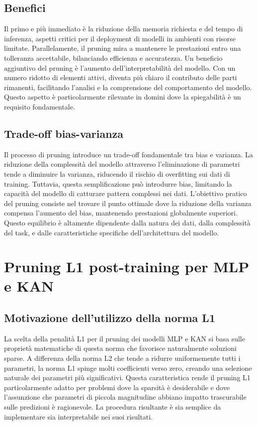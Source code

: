 \documentclass[a4paper,12pt]{report}
\begin{document}
	\subsection{Benefici}
	Il primo e più immediato è la riduzione della memoria richiesta e del tempo di inferenza, aspetti critici per il deployment di modelli in ambienti con risorse limitate. Parallelamente, il pruning mira a mantenere le prestazioni entro una tolleranza accettabile, bilanciando efficienza e accuratezza. Un beneficio aggiuntivo del pruning è l'aumento dell'interpretabilità del modello. Con un numero ridotto di elementi attivi, diventa più chiaro il contributo delle parti rimanenti, facilitando l'analisi e la comprensione del comportamento del modello. Questo aspetto è particolarmente rilevante in domini dove la spiegabilità è un requisito fondamentale.
	
	\subsection{Trade-off bias-varianza}
	Il processo di pruning introduce un trade-off fondamentale tra bias e varianza. La riduzione della complessità del modello attraverso l'eliminazione di parametri tende a diminuire la varianza, riducendo il rischio di overfitting sui dati di training. Tuttavia, questa semplificazione può introdurre bias, limitando la capacità del modello di catturare pattern complessi nei dati. L'obiettivo pratico del pruning consiste nel trovare il punto ottimale dove la riduzione della varianza compensa l'aumento del bias, mantenendo prestazioni globalmente superiori. Questo equilibrio è altamente dipendente dalla natura dei dati, dalla complessità del task, e dalle caratteristiche specifiche dell'architettura del modello.
	
	\section{Pruning L1 post-training per MLP e KAN}
	
	\subsection{Motivazione dell'utilizzo della norma L1}
	La scelta della penalità L1 per il pruning dei modelli MLP e KAN si basa sulle proprietà matematiche di questa norma che favorisce naturalmente soluzioni sparse. A differenza della norma L2 che tende a ridurre uniformemente tutti i parametri, la norma L1 spinge molti coefficienti verso zero, creando una selezione naturale dei parametri più significativi. Questa caratteristica rende il pruning L1 particolarmente adatto per problemi dove la sparsità è desiderabile e dove l'assunzione che parametri di piccola magnitudine abbiano impatto trascurabile sulle predizioni è ragionevole. La procedura risultante è sia semplice da implementare sia interpretabile nei suoi risultati.
	
\end{document}
